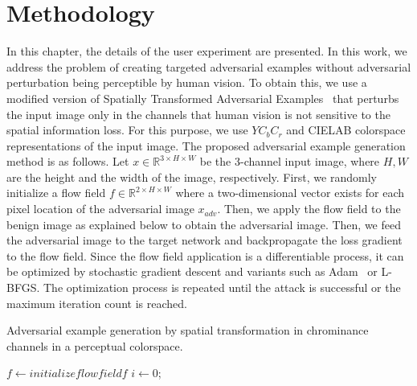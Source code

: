 \chapter{Methodology}
\label{chp:3_methodology}
In this chapter, the details of the user experiment are presented.
In this work, we address the problem of creating targeted adversarial examples without adversarial perturbation being perceptible by human vision. To obtain this, we use a modified version of Spatially Transformed Adversarial Examples~\cite{xiao2018spatially} that perturbs the input image only in the channels that human vision is not sensitive to the spatial information loss. For this purpose, we use \(YC_{b}C_{r}\) and CIELAB colorspace representations of the input image. The proposed adversarial example generation method is as follows. Let \(x \in \mathbb{R}^{3\times H \times W}\) be the 3-channel input image, where \(H, W\) are the height and the width of the image, respectively. First, we randomly initialize a flow field \(f \in \mathbb{R}^{2\times H \times W}\) where a two-dimensional vector exists for each pixel location of the adversarial image \(x_{adv}\). Then, we apply the flow field to the benign image as explained below to obtain the adversarial image. Then, we feed the adversarial image to the target network and backpropagate the loss gradient to the flow field. Since the flow field application is a differentiable process, it can be optimized by stochastic gradient descent and variants such as Adam~\cite{kingma2015adam} or L-BFGS\cite{liu1989limited}. The optimization process is repeated until the attack is successful or the maximum iteration count is reached.
\begin{algorithm}[t]
    \caption{Adversarial example generation by spatial transformation in chrominance channels in a perceptual colorspace. }\label{alg1}
    \(f \gets initialize flow field f\)\;
    \(i \gets 0\);

\end{algorithm}


